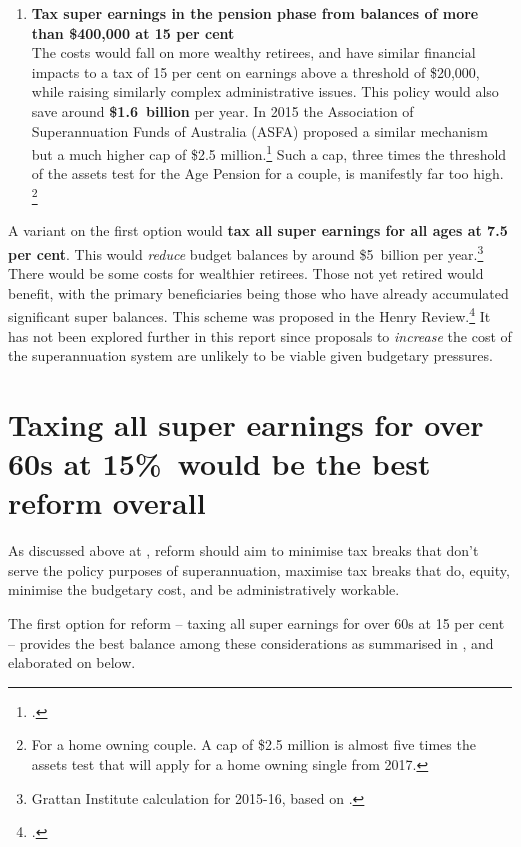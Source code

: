 \begin{enumerate}
%
\item \textbf{Tax super earnings in the pension phase from balances of more than \$400,000 at 15 per cent}\\ 
The costs would fall on more wealthy retirees, and have similar financial impacts to a tax of 15 per cent on earnings above a threshold of \$20,000, while raising similarly complex administrative issues. This policy would also save around \textbf{\$1.6~billion} per year. In 2015 the Association of Superannuation Funds of Australia (ASFA) proposed a similar mechanism but a much higher cap of \$2.5 million.\footcite{Clare2015b}  Such a cap, three times the threshold of the assets test for the Age Pension for a couple, is manifestly far too high.%
\footnote{For a home owning couple. A cap of \$2.5 million is almost five times the assets test that will apply for a home owning single from 2017.}  
\end{enumerate}

A variant on the first option would \textbf{tax all super earnings for all ages at 7.5 per cent}. This would \emph{reduce} budget balances by around \$5~billion per year.\footnote{Grattan Institute calculation for 2015-16, based on \textcite{Treasury2010SuperAdditionalMaterial}.}  There would be some costs for wealthier retirees. Those not yet retired would benefit, with the primary beneficiaries being those who have already accumulated significant super balances. This scheme was proposed in the Henry Review.\footcite[][36]{HenryTaxReview2010}  It has not been explored further in this report since proposals to \emph{increase} the cost of the superannuation system are unlikely to be viable given budgetary pressures.

\section{Taxing all super earnings for over 60s at 15\%\ would be the best reform overall}\label{sec:SUPER-6-4}
As discussed above at , reform should aim to minimise tax breaks that don’t serve the policy purposes of superannuation, maximise tax breaks that do, equity, minimise the budgetary cost, and be administratively workable.%
\enlargethispage{-0.5\baselineskip}\enlargethispage*{-0.5\baselineskip}

The first option for reform – taxing all super earnings for over 60s at 15 per cent – provides the best balance among these considerations as summarised in , and elaborated on below.

